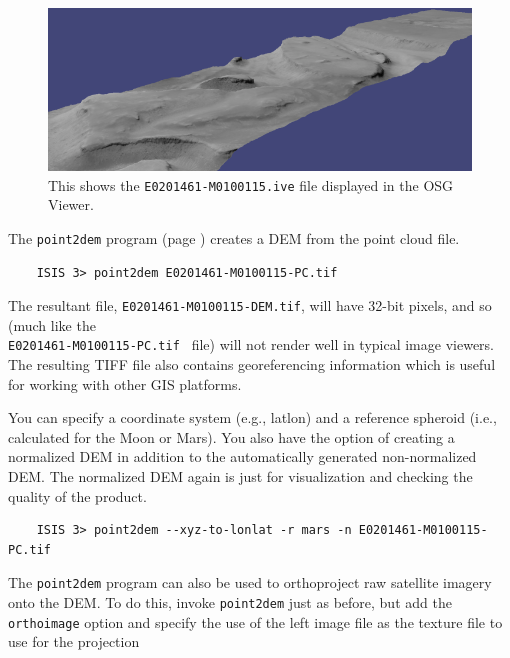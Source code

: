 \begin{figure}[t]
\begin{minipage}{5in}
\includegraphics[width=5in]{images/p19-osg.png}
\end{minipage}
\hfill
\begin{minipage}{1.7in}
\caption[P19 in OSG]{
    \label{p19-osg}
	This shows the \texttt{E0201461-M0100115.ive} file displayed in
	the OSG Viewer.
    }
\end{minipage}
\end{figure}

The \texttt{point2dem} program (page \pageref{point2dem}) creates
a \ac{DEM} from the point cloud file.

\begin{verbatim}
    ISIS 3> point2dem E0201461-M0100115-PC.tif
\end{verbatim}

The resultant file, \texttt{E0201461-M0100115-DEM.tif}, will have
32-bit pixels, and so (much like the \\ 
\texttt{E0201461-M0100115-PC.tif } file) will not render well in
typical image viewers. The resulting TIFF file also contains
georeferencing information which is useful for working with other
GIS platforms.

You can specify a coordinate system (e.g., latlon) and a reference
spheroid (i.e., calculated for the Moon or Mars). You also have the
option of creating a normalized \ac{DEM} in addition to the automatically
generated non-normalized \ac{DEM}. The normalized \ac{DEM} again is just for
visualization and checking the quality of the product.

\begin{verbatim}
    ISIS 3> point2dem --xyz-to-lonlat -r mars -n E0201461-M0100115-PC.tif
\end{verbatim}

\noindent
The \texttt{point2dem} program can also be used to orthoproject raw
satellite imagery onto the \ac{DEM}. To do this, invoke \texttt{point2dem}
just as before, but add the \texttt{orthoimage} option and specify
the use of the left image file as the texture file to use for the
projection

